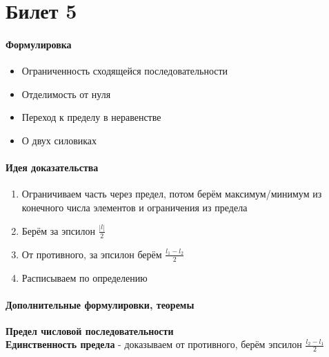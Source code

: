 \documentclass[a4paper,10pt]{article}
\begin{document}
	\section{Билет 5}
	\begin{center} 
		\item \paragraph{Формулировка} 
	\end{center}
	\begin{itemize}
		\item Ограниченность сходящейся последовательности
		\item Отделимость от нуля
		\item Переход к пределу в неравенстве
		\item О двух силовиках
	\end{itemize}
	\begin{center} 
		\item \paragraph{Идея доказательства} 
	\end{center}
	\begin{enumerate}
		\item Ограничиваем часть через предел, потом берём максимум/минимум из конечного числа элементов и ограничения из предела
		\item Берём за эпсилон $\frac{|l|}{2}$
		\item От противного, за эпсилон берём $\frac{l_{1}-l_{2}}{2}$
		\item Расписываем по определению
	\end{enumerate}
	\begin{center} 
		\item \paragraph{Дополнительные формулировки, теоремы} 
	\end{center}
	\textbf{Предел числовой последовательности} \\
	\textbf{Единственность предела} - доказываем от противного, берём эпсилон $\frac{l_{2} - l_{1}}{2}$ \\
\end{document}
